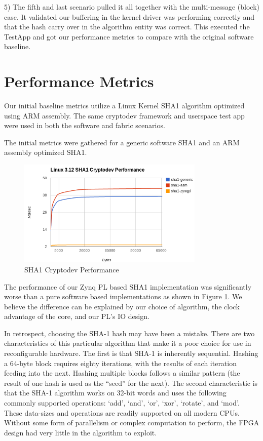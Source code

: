 \documentclass[journal]{IEEEtran}
\begin{document}
5) The fifth and last scenario pulled it all together with the multi-message (block) case.  It validated our buffering in the kernel driver was performing correctly and that the hash carry over in the algorithm entity was correct.   This executed the TestApp and got our performance metrics to compare with the original software baseline.

\section{Performance Metrics}
Our initial baseline metrics utilize a Linux Kernel SHA1 algorithm optimized using ARM assembly.  The same cryptodev framework and userspace test app were used in both the software and fabric scenarios.

The initial metrics were gathered for a generic software SHA1 and an ARM assembly optimized SHA1. 
\begin{figure}[ht]
\centering
\includegraphics[width=3.5in]{perf.png}
\caption{SHA1 Cryptodev Performance}
\label{fig_algoPerf}
\end{figure} 
The performance of our Zynq PL based SHA1 implementation was significantly worse than a pure software based implementations as shown in Figure \ref{fig_algoPerf}. We believe the difference can be explained by our choice of algorithm, the clock advantage of the core, and our PL’s IO design. 

In retrospect, choosing the SHA-1 hash may have been a mistake.  There are two characteristics of this particular algorithm that make it a poor choice for use in reconfigurable hardware.  The first is that SHA-1 is inherently sequential.  Hashing a 64-byte block requires eighty iterations, with the results of each iteration feeding into the next.  Hashing multiple blocks follows a similar pattern (the result of one hash is used as the “seed” for the next).  The second characteristic is that the SHA-1 algorithm works on 32-bit words and uses the following commonly supported operations: ‘add’, ‘and’, ‘or’, ‘xor’, ‘rotate’, and ‘mod’. These data-sizes and operations are readily supported on all modern CPUs.  Without some form of parallelism or complex computation to perform, the FPGA design had very little in the algorithm to exploit.
\end{document}
